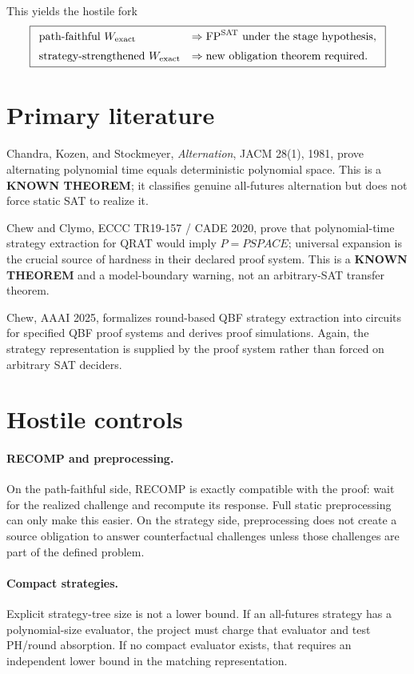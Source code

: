 \documentclass[11pt]{article}
\begin{document}
This yields the hostile fork
\[
\boxed{
\begin{array}{ll}
\text{path-faithful }W_{\rm exact} &\Rightarrow \mathrm{FP}^{\mathrm{SAT}}\text{ under the stage hypothesis},\\[2mm]
\text{strategy-strengthened }W_{\rm exact} &\Rightarrow \text{new obligation theorem required}.
\end{array}}
\]

\section*{Primary literature}
Chandra, Kozen, and Stockmeyer, \emph{Alternation}, JACM 28(1), 1981, prove alternating polynomial time equals deterministic polynomial space. This is a \textbf{KNOWN THEOREM}; it classifies genuine all-futures alternation but does not force static SAT to realize it.

Chew and Clymo, ECCC TR19-157 / CADE 2020, prove that polynomial-time strategy extraction for QRAT would imply $P=PSPACE$; universal expansion is the crucial source of hardness in their declared proof system. This is a \textbf{KNOWN THEOREM} and a model-boundary warning, not an arbitrary-SAT transfer theorem.

Chew, AAAI 2025, formalizes round-based QBF strategy extraction into circuits for specified QBF proof systems and derives proof simulations. Again, the strategy representation is supplied by the proof system rather than forced on arbitrary SAT deciders.

\section*{Hostile controls}
\paragraph{RECOMP and preprocessing.}
On the path-faithful side, RECOMP is exactly compatible with the proof: wait for the realized challenge and recompute its response. Full static preprocessing can only make this easier. On the strategy side, preprocessing does not create a source obligation to answer counterfactual challenges unless those challenges are part of the defined problem.

\paragraph{Compact strategies.}
Explicit strategy-tree size is not a lower bound. If an all-futures strategy has a polynomial-size evaluator, the project must charge that evaluator and test PH/round absorption. If no compact evaluator exists, that requires an independent lower bound in the matching representation.
\end{document}
